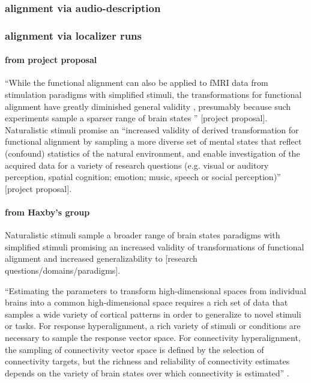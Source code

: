 \subsubsection{alignment via audio-description}


\subsubsection{alignment via localizer runs}


\paragraph{from project proposal}
%
``While the functional alignment can also be applied to fMRI data from
stimulation paradigms with simplified stimuli, the transformations for
functional alignment have greatly diminished general validity
\citep{haxby2011common}, presumably because such experiments sample a sparser
range of brain states \citep{guntupalli2016model}'' [project proposal].
%
Naturalistic stimuli promise an ``increased validity of derived transformation
for functional alignment by sampling a more diverse set of mental states that
reflect (confound) statistics of the natural environment, and enable
investigation of the acquired data for a variety of research questions (e.g.
visual or auditory perception, spatial cognition; emotion; music, speech or
social perception)'' [project proposal].


\paragraph{from Haxby's group}

%
Naturalistic stimuli sample a broader range of brain states paradigms
with simplified stimuli \citep{guntupalli2016model, haxby2011common} promising
an increased validity of transformations of functional alignment and increased
generalizability to [research questions/domains/paradigms].

%
``Estimating the parameters to transform high-dimensional spaces from individual
brains into a common high-dimensional space requires a rich set of data that
samples a wide variety of cortical patterns in order to generalize to novel
stimuli or tasks.
%
For response hyperalignment, a rich variety of stimuli or conditions are
necessary to sample the response vector space.
%
For connectivity hyperalignment, the sampling of connectivity vector space is
defined by the selection of connectivity targets, but the richness and
reliability of connectivity estimates depends on the variety of brain states
over which connectivity is estimated'' \citep{haxby2020hyperalignment}.

